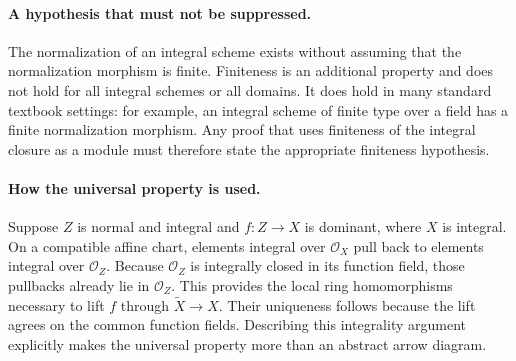 \paragraph{A hypothesis that must not be suppressed.}
The normalization of an integral scheme exists without assuming that
the normalization morphism is finite.  Finiteness is an additional
property and does not hold for all integral schemes or all domains.
It does hold in many standard textbook settings: for example, an
integral scheme of finite type over a field has a finite normalization
morphism.  Any proof that uses finiteness of the integral closure as a
module must therefore state the appropriate finiteness hypothesis.

\paragraph{How the universal property is used.}
Suppose \(Z\) is normal and integral and \(f:Z\to X\) is dominant,
where \(X\) is integral.  On a compatible affine chart, elements
integral over \(\mathcal O_X\) pull back to elements integral over
\(\mathcal O_Z\).  Because \(\mathcal O_Z\) is integrally closed in
its function field, those pullbacks already lie in \(\mathcal O_Z\).
This provides the local ring homomorphisms necessary to lift \(f\)
through \(\widetilde X\to X\).  Their uniqueness follows because
the lift agrees on the common function fields.  Describing this
integrality argument explicitly makes the universal property more
than an abstract arrow diagram.
